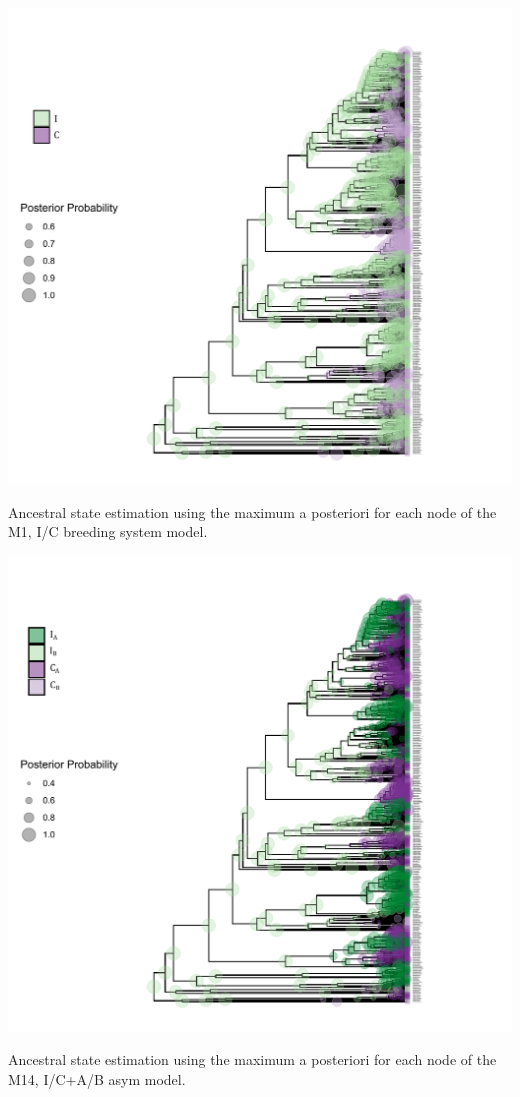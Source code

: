 \begin{suppfigure}
\includegraphics[width=\textwidth]{asrIC.pdf}
\caption{Ancestral state estimation using the maximum a posteriori for each node of the M1, I/C breeding system model.} %
\label{suppfigure:ICasr}
\end{suppfigure}



\begin{suppfigure}
\includegraphics[width=\textwidth]{asrICAB.pdf}
\caption{Ancestral state estimation using the maximum a posteriori for each node of the M14, I/C+A/B asym model.} %
\label{suppfigure:ICABasr}
\end{suppfigure}


